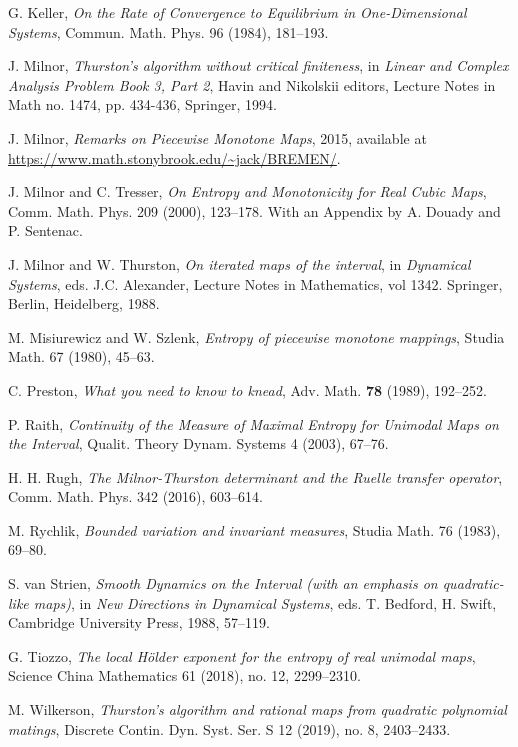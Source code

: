 \documentclass[11pt]{amsart}
\begin{document}
\begin{thebibliography}{99}
G. Keller, 
\emph{On the Rate of Convergence to Equilibrium in One-Dimensional Systems}, 
Commun. Math. Phys. 96 (1984), 181--193.

J. Milnor, \emph{Thurston's algorithm without critical finiteness}, in \emph{Linear and
Complex Analysis Problem Book 3, Part 2}, Havin and Nikolskii editors, Lecture
Notes in Math no. 1474, pp. 434-436, Springer, 1994.

J. Milnor, \emph{Remarks on Piecewise Monotone Maps}, 2015, 
available at \url{https://www.math.stonybrook.edu/~jack/BREMEN/}.

J. Milnor and C. Tresser,
\emph{On Entropy and Monotonicity for Real Cubic Maps}, 
Comm. Math. Phys. 209 (2000), 123--178. With an Appendix by A. Douady and P. Sentenac.

J. Milnor and W. Thurston, 
\emph{On iterated maps of the interval}, in \emph{Dynamical Systems}, eds. J.C. Alexander, 
Lecture Notes in Mathematics, vol 1342. Springer, Berlin, Heidelberg, 1988.

M. Misiurewicz and W. Szlenk, 
\emph{Entropy of piecewise monotone mappings}, 
Studia Math. 67 (1980), 45--63.

C. Preston, 
\emph{What you need to know to knead}, 
Adv. Math. {\bf 78} (1989), 192--252.

P. Raith, \emph{Continuity of the Measure of Maximal Entropy for Unimodal Maps on the Interval}, 
Qualit. Theory Dynam. Systems 4 (2003), 67--76.

H. H. Rugh, 
\emph{The Milnor-Thurston determinant and the Ruelle transfer operator}, 
Comm. Math. Phys. 342 (2016), 603--614. 

M. Rychlik, \emph{Bounded variation and invariant measures}, 
Studia Math. 76 (1983), 69--80.

S. van Strien, \emph{Smooth Dynamics on the Interval (with an emphasis on quadratic-like maps)}, 
in \emph{New Directions in Dynamical Systems}, eds. 
T. Bedford, H. Swift, Cambridge University Press, 1988, 57--119.

G. Tiozzo, \emph{The local H\"older exponent for the entropy of real unimodal maps}, 
Science China Mathematics 61 (2018), no. 12, 2299--2310.

M. Wilkerson, \emph{Thurston's algorithm and rational maps from quadratic polynomial matings},
Discrete Contin. Dyn. Syst. Ser. S 12 (2019), no. 8, 2403--2433.

\end{thebibliography}
\end{document}
